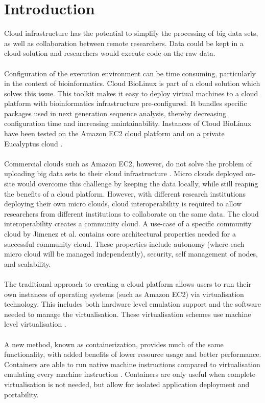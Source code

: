 \documentclass{sig-alternate-05-2015}
\begin{document}
\section{Introduction}
Cloud infrastructure has the potential to simplify the processing of big data sets, as well as collaboration between remote researchers. Data could be kept in a cloud solution and researchers would execute code on the raw data.
\\
\\
Configuration of the execution environment can be time consuming, particularly in the context of bioinformatics. Cloud BioLinux is part of a cloud solution which solves this issue. This toolkit makes it easy to deploy virtual machines to a cloud platform with bioinformatics infrastructure pre-configured. It bundles specific packages used in next generation sequence analysis, thereby decreasing configuration time and increasing maintainability. Instances of Cloud BioLinux have been tested on the Amazon EC2 cloud platform and on a private Eucalyptus cloud \cite{krampis2012cloud}. 
\\
\\
Commercial clouds such as Amazon EC2, however, do not solve the problem of uploading big data sets to their cloud infrastructure \cite{baker2010next}. Micro clouds deployed on-site would overcome this challenge by keeping the data locally, while still reaping the benefits of a cloud platform. However, with different research institutions deploying their own micro clouds, cloud interoperability is required to allow researchers from different institutions to collaborate on the same data. The cloud interoperability creates a community cloud. A use-case of a specific community cloud  by Jimenez et al. \cite{jimenez2014deploying} contains core architectural properties needed for a successful community cloud. These properties include autonomy (where each micro cloud will be managed independently), security, self management of nodes, and scalability.
\\
\\
The traditional approach to creating a cloud platform allows users to run their own instances of operating systems (such as Amazon EC2) via virtualisation technology. This includes both hardware level emulation support and the software needed to manage the virtualisation. These virtualisation schemes use machine level virtualisation \cite{fink2014docker}. \\\\
A new method, known as containerization, provides much of the same functionality, with added benefits of lower resource usage and better performance. Containers are able to run native machine instructions compared to virtualisation emulating every machine instruction \cite{dua2014virtualization}. Containers are only useful when complete virtualisation is not needed, but allow for isolated application deployment and portability.
\end{document}
